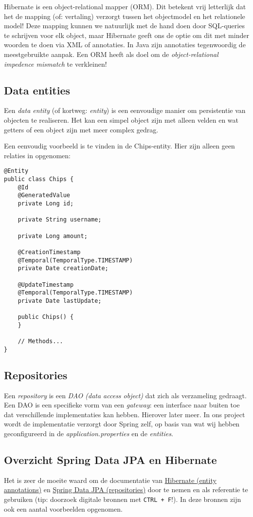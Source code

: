 \documentclass[dutch,a4paper,12pt,doubleside]{book}
\begin{document}
Hibernate is een object-relational mapper (ORM). Dit betekent vrij letterlijk
dat het de mapping (of: vertaling) verzorgt tussen het objectmodel 
en het relationele model!
Deze mapping kunnen we natuurlijk met de hand doen 
door SQL-queries te schrijven voor elk object, maar Hibernate geeft ons de optie 
om dit met minder woorden te doen via XML of annotaties. In Java zijn 
annotaties tegenwoordig de meestgebruikte aanpak.
Een ORM heeft als doel om de 
\textit{object-relational impedence mismatch} te verkleinen!

\subsection{Data entities}
Een \textit{data entity} (of kortweg: \textit{entity}) is 
een eenvoudige manier om persistentie van objecten te realiseren. 
Het kan een simpel object zijn met alleen velden en wat getters
of een object zijn met meer complex gedrag. 

Een eenvoudig voorbeeld is te vinden in de Chips-entity.
Hier zijn alleen geen relaties in opgenomen:

\begin{verbatim}
@Entity
public class Chips {
    @Id
    @GeneratedValue
    private Long id;

    private String username;

    private Long amount;

    @CreationTimestamp
    @Temporal(TemporalType.TIMESTAMP)
    private Date creationDate;

    @UpdateTimestamp
    @Temporal(TemporalType.TIMESTAMP)
    private Date lastUpdate;

    public Chips() {
    }

    // Methods...
}
\end{verbatim}

\subsection{Repositories}
Een \textit{repository} is een \textit{DAO (data access object)} 
dat zich als verzameling gedraagt. 
Een DAO is een specifieke vorm van een \textit{gateway}: 
een interface naar buiten toe dat verschillende implementaties kan hebben.
Hierover later meer.
In ons project wordt de implementatie verzorgt door Spring zelf, op basis van wat 
wij hebben geconfigureerd in de \textit{application.properties} en de \textit{entities}.

\subsection{Overzicht Spring Data JPA en Hibernate}
Het is zeer de moeite waard om de documentatie van 
\href{https://docs.jboss.org/hibernate/stable/annotations/reference/en/html_single/#entity-overview}{Hibernate (entity annotations)}
en 
\href{https://docs.spring.io/spring-data/jpa/docs/current/reference/html/#repositories}{Spring Data JPA (repositories)}
door te nemen en als referentie te gebruiken (tip: doorzoek digitale bronnen met \texttt{CTRL + F}!). 
In deze bronnen zijn ook een aantal voorbeelden opgenomen.
\end{document}
